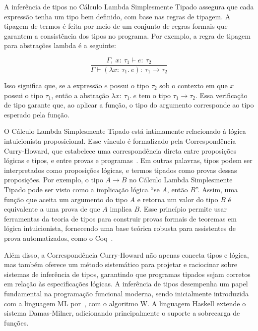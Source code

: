A inferência de tipos no Cálculo Lambda Simplesmente Tipado assegura que cada expressão tenha um tipo bem definido, com base nas regras de tipagem.
A tipagem de termos é feita por meio de um conjunto de regras formais que garantem a consistência dos tipos no programa.
Por exemplo, a regra de tipagem para abstrações lambda é a seguinte:

\[
  \frac{\Gamma,\ x{:}\ \tau_1 \vdash e{:}\ \tau_2}{\Gamma \vdash (\lambda x{:}\ \tau_1.\ e){:}\ \tau_1 \to \tau_2}
\]

Isso significa que, se a expressão $e$ possui o tipo $\tau_2$ sob o contexto em que $x$ possui o tipo $\tau_1$, então a abstração $\lambda x{:}\ \tau_1.\ e$ tem o tipo $\tau_1 \to \tau_2$.
Essa verificação de tipo garante que, ao aplicar a função, o tipo do argumento corresponde ao tipo esperado pela função.

O Cálculo Lambda Simplesmente Tipado está intimamente relacionado à lógica intuicionista proposicional.
Esse vínculo é formalizado pela Correspondência Curry-Howard, que estabelece uma correspondência direta entre proposições lógicas e tipos, e entre provas e programas~\cite{pierce2002types}.
Em outras palavras, tipos podem ser interpretados como proposições lógicas, e termos tipados como provas dessas proposições.
Por exemplo, o tipo $A \to B$ no Cálculo Lambda Simplesmente Tipado pode ser visto como a implicação lógica ``se $A$, então $B$''.
Assim, uma função que aceita um argumento do tipo $A$ e retorna um valor do tipo $B$ é equivalente a uma prova de que $A$ implica $B$.
Esse princípio permite usar ferramentas da teoria de tipos para construir provas formais de teoremas em lógica intuicionista, fornecendo uma base teórica robusta para assistentes de prova automatizados, como o Coq~\cite{coquand1988calculus}.

Além disso, a Correspondência Curry-Howard não apenas conecta tipos e lógica, mas também oferece um método sistemático para projetar e raciocinar sobre sistemas de inferência de tipos, garantindo que programas tipados sejam corretos em relação às especificações lógicas.
A inferência de tipos desempenha um papel fundamental na programação funcional moderna, sendo inicialmente introduzida com a linguagem ML por~, com o algoritmo W.
A linguagem Haskell extende o sistema Damas-Milner, adicionando principalmente o suporte a sobrecarga de funções.
